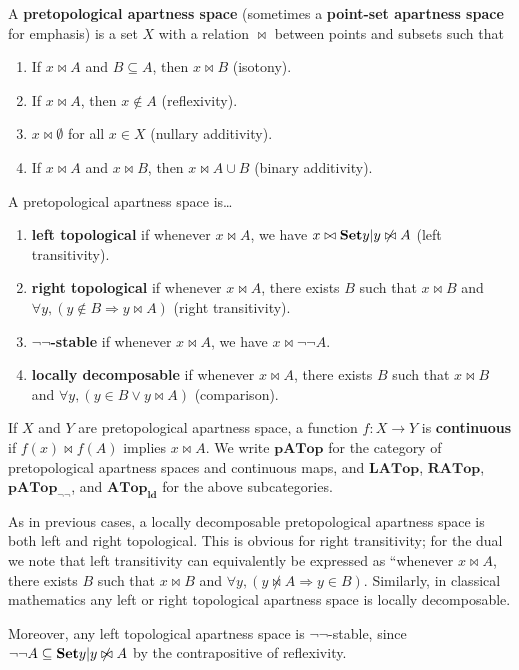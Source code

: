 \documentclass{article}
\def\cpl#1{\neg #1}
\let\implies\Rightarrow
\def\nn{\ensuremath{\neg\neg}}
\def\PATop{\mathbf{pATop}}
\def\LATop{\mathbf{LATop}}
\def\RATop{\mathbf{RATop}}
\def\PATopnn{\mathbf{pATop}_{\nn}}
\def\ldATop{\mathbf{ATop}_{\mathbf{ld}}}
\begin{document}
\begin{defn}
  A \textbf{pretopological apartness space} (sometimes a \textbf{point-set apartness space} for emphasis) is a set $X$ with a relation $\bowtie$ between points and subsets such that
  \begin{enumerate}
  \item If $x\bowtie A$ and $B\subseteq A$, then $x\bowtie B$ (isotony).
  \item If $x\bowtie A$, then $x\notin A$ (reflexivity).
  \item $x\bowtie \emptyset$ for all $x\in X$ (nullary additivity).
  \item If $x\bowtie A$ and $x\bowtie B$, then $x\bowtie A\cup B$ (binary additivity).
  \end{enumerate}
  A pretopological apartness space is\dots
  \begin{enumerate}[resume]
  \item \textbf{left topological} if whenever $x\bowtie A$, we have $x\bowtie \setof{ y | y \not\bowtie A }$ (left transitivity).
  \item \textbf{right topological} if whenever $x\bowtie A$, there exists $B$ such that $x\bowtie B$ and $\forall y, (y\notin B \implies y\bowtie A)$ (right transitivity).
  \item \textbf{\nn-stable} if whenever $x\bowtie A$, we have $x\bowtie \cpl{\cpl{A}}$.
  \item \textbf{locally decomposable} if whenever $x\bowtie A$, there exists $B$ such that $x\bowtie B$ and $\forall y, (y\in B \lor y\bowtie A)$ (comparison).
  \end{enumerate}
  If $X$ and $Y$ are pretopological apartness space, a function $f:X\to Y$ is \textbf{continuous} if $f(x)\bowtie f(A)$ implies $x\bowtie A$.
  We write $\PATop$ for the category of pretopological apartness spaces and continuous maps, and $\LATop$, $\RATop$, $\PATopnn$, and $\ldATop$ for the above subcategories.
\end{defn}

As in previous cases, a locally decomposable pretopological apartness space is both left and right topological.
This is obvious for right transitivity; for the dual we note that left transitivity can equivalently be expressed as ``whenever $x\bowtie A$, there exists $B$ such that $x\bowtie B$ and $\forall y, (y\not\bowtie A \implies y\in B)$.
Similarly, in classical mathematics any left or right topological apartness space is locally decomposable.

Moreover, any left topological apartness space is \nn-stable, since $\cpl{\cpl{A}}\subseteq \setof{ y | y \not\bowtie A }$ by the contrapositive of reflexivity.
\end{document}
